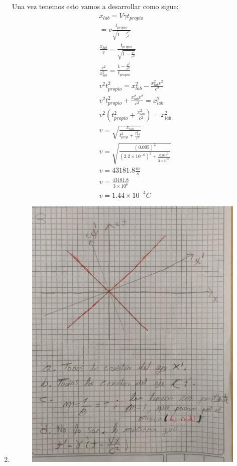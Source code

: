 \documentclass[12pt]{exam}
\begin{document}
\begin{enumerate}
		Una vez tenemos esto vamos a desarrollar como sigue:
		\begin{align*}
			&x_{lab} = V \gamma t_{propio}\\
			&= v\frac{t_{propio}}{\sqrt{1-\frac{v^2}{c^2}}}\\
			&\frac{x_{lab}}{v}=\frac{t_{propio}}{\sqrt{1-\frac{v^2}{c^2}}}\\
			&\frac{v^2}{x_{lab}^2} = \frac{1-\frac{v^2}{c^2}}{t_{propio}}\\
			&v^2t_{propio}^2 = x^2_{lab}-\frac{x_{lab}^2v^2}{c^2}\\
			&v^2t_{propio}^2 +\frac{x_{lab}^2v^2}{c^2} = x_{lab}^2\\
			&v^{2}(t_{propio}^2+\frac{x_{lab}^2}{c^2}) = x_{lab}^2\\
			&v=\sqrt{\frac{x_{lab}}{t_{prop}^2+\frac{x_{lab}^2}{c^2}}}\\
			&v=\sqrt{\frac{(0.095)^2}{(2.2\times10^{-6})^2+\frac{0.095^2}{3\times10^{8}^2}}}\\
			&v=43181.8 \frac{m}{s}\\
			&v=\frac{43181.8}{3\times10^{8}}\\
			&v= 1.44\times10^{-4}C
		\end{align*}
	\item \begin{figure}
		\centering
		\includegraphics[scale=0.4]{Punto3.jpeg}
	\end{figure}
\end{enumerate}
\end{document}
